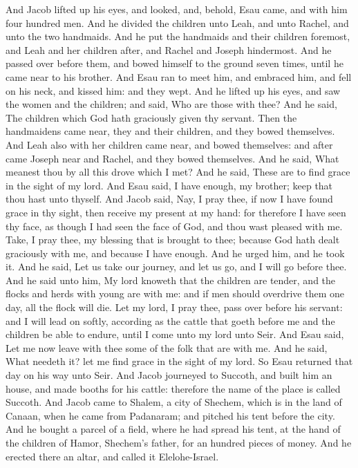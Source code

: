 \begin{biblechapter} %
 And Jacob lifted up his eyes, and looked, and, behold, Esau came, and with him four hundred men. And he divided the children unto Leah, and unto Rachel, and unto the two handmaids.
\verse And he put the handmaids and their children foremost, and Leah and her children after, and Rachel and Joseph hindermost.
\verse And he passed over before them, and bowed himself to the ground seven times, until he came near to his brother.
\verse And Esau ran to meet him, and embraced him, and fell on his neck, and kissed him: and they wept.
\verse And he lifted up his eyes, and saw the women and the children; and said, Who are those with thee? And he said, The children which God hath graciously given thy servant.
\verse Then the handmaidens came near, they and their children, and they bowed themselves.
\verse And Leah also with her children came near, and bowed themselves: and after came Joseph near and Rachel, and they bowed themselves.
\verse And he said, What meanest thou by all this drove which I met? And he said, These are to find grace in the sight of my lord.
\verse And Esau said, I have enough, my brother; keep that thou hast unto thyself.
\verse And Jacob said, Nay, I pray thee, if now I have found grace in thy sight, then receive my present at my hand: for therefore I have seen thy face, as though I had seen the face of God, and thou wast pleased with me.
\verse Take, I pray thee, my blessing that is brought to thee; because God hath dealt graciously with me, and because I have enough. And he urged him, and he took it.
\verse And he said, Let us take our journey, and let us go, and I will go before thee.
\verse And he said unto him, My lord knoweth that the children are tender, and the flocks and herds with young are with me: and if men should overdrive them one day, all the flock will die.
\verse Let my lord, I pray thee, pass over before his servant: and I will lead on softly, according as the cattle that goeth before me and the children be able to endure, until I come unto my lord unto Seir.
\verse And Esau said, Let me now leave with thee some of the folk that are with me. And he said, What needeth it? let me find grace in the sight of my lord.
\verse So Esau returned that day on his way unto Seir.
\verse And Jacob journeyed to Succoth, and built him an house, and made booths for his cattle: therefore the name of the place is called Succoth.
\verse And Jacob came to Shalem, a city of Shechem, which is in the land of Canaan, when he came from Padanaram; and pitched his tent before the city.
\verse And he bought a parcel of a field, where he had spread his tent, at the hand of the children of Hamor, Shechem's father, for an hundred pieces of money.
\verse And he erected there an altar, and called it Elelohe-Israel.
\end{biblechapter}

